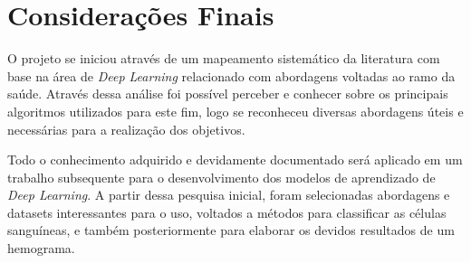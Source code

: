 \chapter{Considerações Finais}
\label{chap:conclusoes}

O projeto se iniciou através de um mapeamento sistemático da literatura com base na área de \emph{Deep Learning} relacionado com abordagens voltadas ao ramo da saúde. Através dessa análise foi possível perceber e conhecer sobre os principais algoritmos utilizados para este fim, logo se reconheceu diversas abordagens úteis e necessárias para a realização dos objetivos.

Todo o conhecimento adquirido e devidamente documentado será aplicado em um trabalho subsequente para o desenvolvimento dos modelos de aprendizado de \emph{Deep Learning}. A partir dessa pesquisa inicial, foram selecionadas abordagens e datasets interessantes para o uso, voltados a métodos para classificar as células sanguíneas, e também posteriormente para elaborar os devidos resultados de um hemograma.